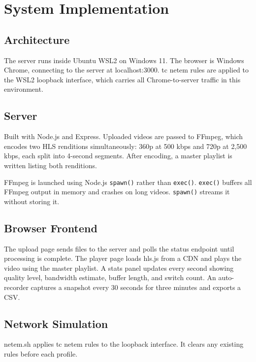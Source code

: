 \documentclass[12pt]{article}
\begin{document}
\section{System Implementation}

\subsection{Architecture}

The server runs inside Ubuntu WSL2 on Windows 11. The browser is Windows Chrome, connecting to the server at localhost:3000. tc netem rules are applied to the WSL2 loopback interface, which carries all Chrome-to-server traffic in this environment.

\subsection{Server}

Built with Node.js and Express. Uploaded videos are passed to FFmpeg, which encodes two HLS renditions simultaneously: 360p at 500 kbps and 720p at 2,500 kbps, each split into 4-second segments. After encoding, a master playlist is written listing both renditions.

FFmpeg is launched using Node.js \texttt{spawn()} rather than \texttt{exec()}. \texttt{exec()} buffers all FFmpeg output in memory and crashes on long videos. \texttt{spawn()} streams it without storing it.

\subsection{Browser Frontend}

The upload page sends files to the server and polls the status endpoint until processing is complete. The player page loads hls.js from a CDN and plays the video using the master playlist. A stats panel updates every second showing quality level, bandwidth estimate, buffer length, and switch count. An auto-recorder captures a snapshot every 30 seconds for three minutes and exports a CSV.

\subsection{Network Simulation}

netem.sh applies tc netem rules to the loopback interface. It clears any existing rules before each profile.
\end{document}

